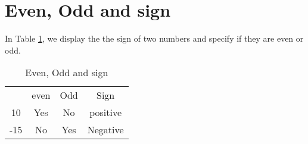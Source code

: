 \documentclass[10pt,a4paper]{article}
\begin{document}
\section{Even, Odd and sign}
In Table \ref{Table 2}, we display the the sign of two numbers and specify if they are even or odd.
\begin{table}[h!]
\centering
\begin{tabular}{|c c c c|}
\hline
 & even & Odd & Sign\\
\cline{2-4}
 10 & Yes & No &positive\\
\cline{2-4}
-15 & No& Yes& Negative\\
\hline
\end{tabular}
   \caption{Even, Odd and sign} 
   \label{Table 2}
\end{table}
\end{document}
